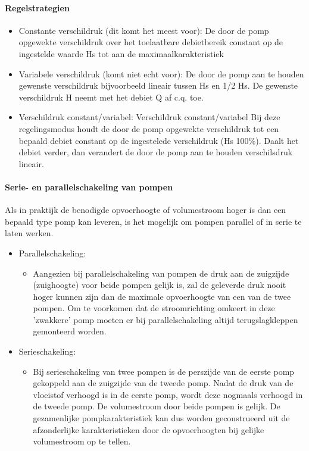 \documentclass[12pt]{article}
\begin{document}
\paragraph{Regelstrategien}
\begin{itemize}
    \item Constante verschildruk (dit komt het meest voor): De door de pomp opgewekte verschildruk over het toelaatbare debietbereik constant op de ingestelde waarde Hs tot aan de maximaalkarakteristiek
    \item Variabele verschildruk (komt niet echt voor): De door de pomp aan te houden gewenste verschildruk bijvoorbeeld lineair tussen Hs en 1/2 Hs. De gewenste verschildruk H neemt met het debiet Q af c.q. toe.
    \item Verschildruk constant/variabel: Verschildruk constant/variabel Bij deze regelingsmodus houdt de door de pomp opgewekte verschildruk tot een bepaald debiet constant op de ingestelede verschildruk (Hs 100\%). Daalt het debiet verder, dan verandert de door de pomp aan te houden verschilsdruk lineair.
\end{itemize}
\paragraph{Serie- en parallelschakeling van pompen}
Als in praktijk de benodigde opvoerhoogte of volumestroom hoger is dan een bepaald type pomp kan leveren, is het mogelijk om pompen parallel of in serie te laten werken.
\begin{itemize}
    \item Parallelschakeling:\begin{itemize}
        \item Aangezien bij parallelschakeling van pompen de druk aan de zuigzijde (zuighoogte) voor beide pompen gelijk is, zal de geleverde druk nooit hoger kunnen zijn dan de maximale opvoerhoogte van een van de twee pompen. Om te voorkomen dat de stroomrichting omkeert in deze 'zwakkere' pomp moeten er bij parallelschakeling altijd terugslagkleppen gemonteerd worden.
    \end{itemize}
    \item Serieschakeling:\begin{itemize}
        \item Bij serieschakeling van twee pompen is de perszijde van de eerste pomp gekoppeld aan de zuigzijde van de tweede pomp. Nadat de druk van de vloeistof verhoogd is in de eerste pomp, wordt deze nogmaals verhoogd in de tweede pomp. De volumestroom door beide pompen is gelijk. De gezamenlijke pompkarakteristiek kan dus worden geconstrueerd uit de afzonderlijke karakteristieken door de opvoerhoogten bij gelijke volumestroom op te tellen.
    \end{itemize}
\end{itemize}
\end{document}
